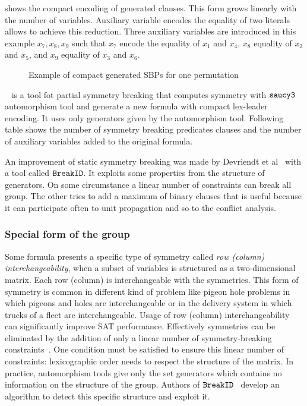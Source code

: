  shows the compact encoding of generated clauses. This form grows linearly with the number of variables.
Auxiliary variable encodes the equality of two literals allows to achieve this reduction. Three auxiliary variables are introduced
in this example $x_7, x_8, x_9$ such that $x_7$ encode the equality of $x_1$ and $x_4$, $x_8$ equality of $x_2$ and $x_5$, and $x_9$ equality of $x_3$ and $x_6$.
 \begin{figure}[!htbp]
 
 \caption{Example of compact generated SBPs for one permutation}
 \label{fig:esbp_compact_gen}
\end{figure}

\shatter~\cite{aloul06} is a tool fot partial symmetry breaking that computes symmetry with $\texttt{saucy3}$ automorphism tool and generate a new formula with compact lex-leader encoding. It uses only generators given by the automorphism tool. Following table shows the number of symmetry breaking predicates clauses and the
number of auxiliary variables added to the original formula.



%

An improvement of static symmetry breaking was made by Devriendt et al~\cite{devriendt2016improved} with a tool 
called $\texttt{BreakID}$. It exploits some properties from the structure of generators. On some circumstance 
a linear number of constraints can break all group. The other tries to add a maximum of binary clauses that 
is useful because it can participate often to unit propagation and so to the conflict analysis.

\subsubsection{Special form of the group} \label{sec:matrix-sbp}
Some formula presents a specific type of symmetry called \emph{row (column) interchangeability}, when a
subset of variables is structured as a two-dimensional matrix. Each row (column) is interchangeable
with the symmetries. 
This form of symmetry is common in different kind of problem like pigeon hole problems in which
pigeons and holes are interchangeable or in the delivery system in which trucks of a fleet are interchangeable.
Usage of row (column) interchangeability can significantly improve SAT performance. 
Effectively symmetries can be eliminated by the addition 
of only a linear number of symmetry-breaking constraints~\cite{flener2002breaking}. 
One condition must be satisfied to ensure this linear number of constraints:
lexicographic order needs to respect the structure of the matrix.
In practice, automorphism tools give only the set generators which contains no information on
the structure of the group. 
Authors of $\texttt{BreakID}$~\cite{devriendt2016improved} develop an algorithm to detect this specific 
structure and exploit it.

